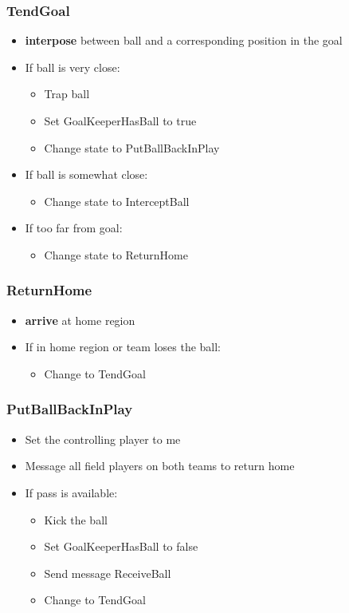 \documentclass[handout,t,compress]{beamer}
\newcommand{\bframe}[1]{\begin{frame}[fragile]\frametitle{#1}}
\begin{document}
\bframe{TendGoal}
\begin{itemize}
\item {\bf interpose} between ball and a corresponding position in the goal
\item If ball is very close:
\begin{itemize}
\item Trap ball
\item Set GoalKeeperHasBall to true
\item Change state to PutBallBackInPlay
\end{itemize}
\item If ball is somewhat close:
\begin{itemize}
\item Change state to InterceptBall
\end{itemize}
\item If too far from goal:
\begin{itemize}
\item Change state to ReturnHome
\end{itemize}
\end{itemize}
\end{frame}

\bframe{ReturnHome}
\begin{itemize}
\item {\bf arrive} at home region
\item If in home region or team loses the ball:
\begin{itemize}
\item Change to TendGoal
\end{itemize}
\end{itemize}
\end{frame}

\bframe{PutBallBackInPlay}
\begin{itemize}
\item Set the controlling player to me
\item Message all field players on both teams to return home
\item If pass is available:
\begin{itemize}
\item Kick the ball
\item Set GoalKeeperHasBall to false
\item Send message ReceiveBall
\item Change to TendGoal
\end{itemize}
\end{itemize}
\end{frame}
\end{document}
